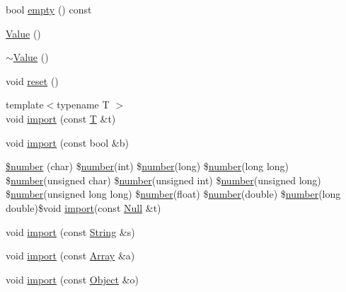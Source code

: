 \begin{DoxyCompactItemize}
\item 
bool \hyperlink{classjsonxx_1_1_value_af57bb610dd6dc3bfa943623e8694ecd1}{empty} () const 
\item 
\hyperlink{classjsonxx_1_1_value_a57931515270809031ef1add1665a4cfd}{Value} ()
\item 
\hyperlink{classjsonxx_1_1_value_af789a314d0a4a9c98b64ec9325ac61e4}{$\sim$\+Value} ()
\item 
void \hyperlink{classjsonxx_1_1_value_ae02ba9a56af7a601ea2f2879d068153e}{reset} ()
\item 
{\footnotesize template$<$typename T $>$ }\\void \hyperlink{classjsonxx_1_1_value_ad12e7a5b0cb284a7ccdd3daf446091af}{import} (const \hyperlink{http__parser_8c_ad24d0de3f597ca60dd95c4bc59c2ff73}{T} \&t)
\item 
void \hyperlink{classjsonxx_1_1_value_ae78fbbab5fda5a42b854ca9d4d52a5eb}{import} (const bool \&b)
\item 
\hyperlink{classjsonxx_1_1_value_a8316ec94dc82e1f7affeea6ca9d7ac28}{\$number} (char) \$\hyperlink{msg__server_2jsonxx_8h_a590bcfd46c7e83d5b834775f77aa42a3}{number}(int) \$\hyperlink{msg__server_2jsonxx_8h_a590bcfd46c7e83d5b834775f77aa42a3}{number}(long) \$\hyperlink{msg__server_2jsonxx_8h_a590bcfd46c7e83d5b834775f77aa42a3}{number}(long long) \$\hyperlink{msg__server_2jsonxx_8h_a590bcfd46c7e83d5b834775f77aa42a3}{number}(unsigned char) \$\hyperlink{msg__server_2jsonxx_8h_a590bcfd46c7e83d5b834775f77aa42a3}{number}(unsigned int) \$\hyperlink{msg__server_2jsonxx_8h_a590bcfd46c7e83d5b834775f77aa42a3}{number}(unsigned long) \$\hyperlink{msg__server_2jsonxx_8h_a590bcfd46c7e83d5b834775f77aa42a3}{number}(unsigned long long) \$\hyperlink{msg__server_2jsonxx_8h_a590bcfd46c7e83d5b834775f77aa42a3}{number}(float) \$\hyperlink{msg__server_2jsonxx_8h_a590bcfd46c7e83d5b834775f77aa42a3}{number}(double) \$\hyperlink{msg__server_2jsonxx_8h_a590bcfd46c7e83d5b834775f77aa42a3}{number}(long double)\$void \hyperlink{classjsonxx_1_1_value_ad12e7a5b0cb284a7ccdd3daf446091af}{import}(const \hyperlink{structjsonxx_1_1_null}{Null} \&t)
\item 
void \hyperlink{classjsonxx_1_1_value_a23c261aa7829fe8f372e1e2ede7dc007}{import} (const \hyperlink{namespacejsonxx_a29c7a7494bb75c227bdbd208dc80a09f}{String} \&s)
\item 
void \hyperlink{classjsonxx_1_1_value_a2da69844568f4af69f14a2ea78184e7e}{import} (const \hyperlink{classjsonxx_1_1_array}{Array} \&a)
\item 
void \hyperlink{classjsonxx_1_1_value_ac33910bc464d6a7d42024c520cff98e3}{import} (const \hyperlink{classjsonxx_1_1_object}{Object} \&o)

\end{DoxyCompactItemize}
